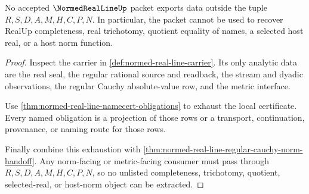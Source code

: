 \begin{theorem}
\label{thm:normed-real-line-non-escape}
No accepted $\NormedRealLineUp$ packet exports data outside the tuple $R,S,D,A,M,H,C,P,N$. In particular, the packet cannot be used to recover RealUp completeness, real trichotomy, quotient equality of names, a selected host real, or a host norm function.
\end{theorem}
\begin{proof}
Inspect the carrier in \autoref{def:normed-real-line-carrier}. Its only analytic data are the real seal, the regular rational source and readback, the stream and dyadic observations, the regular Cauchy absolute-value row, and the metric interface.

Use \autoref{thm:normed-real-line-namecert-obligations} to exhaust the local certificate. Every named obligation is a projection of those rows or a transport, continuation, provenance, or naming route for those rows.

Finally combine this exhaustion with \autoref{thm:normed-real-line-regular-cauchy-norm-handoff}. Any norm-facing or metric-facing consumer must pass through $R,S,D,A,M,H,C,P,N$, so no unlisted completeness, trichotomy, quotient, selected-real, or host-norm object can be extracted.
\end{proof}

\begin{closurestatus}{\NormedRealLineUp}
  \theoryclosure{\seedClosure}
  \formalstatus{\unformalizedV}
\end{closurestatus}
